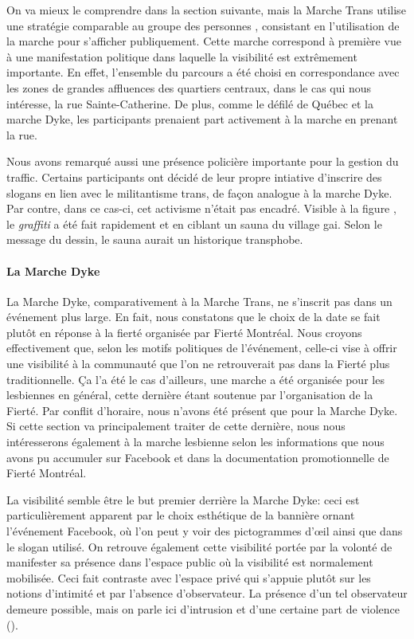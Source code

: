 On va mieux le comprendre dans la section suivante, mais la Marche Trans utilise une stratégie comparable au groupe des personnes \dyke{}, consistant en l'utilisation de la marche pour s'afficher publiquement.
Cette marche correspond à première vue à une manifestation politique dans laquelle la visibilité est extrêmement importante.
En effet, l'ensemble du parcours a été choisi en correspondance avec les zones de grandes affluences des quartiers centraux, dans le cas qui nous intéresse, la rue Sainte-Catherine.
De plus, comme le défilé de Québec et la marche Dyke, les participants prenaient part activement à la marche en prenant la rue.

Nous avons remarqué aussi une présence policière importante pour la gestion du traffic.
Certains participants ont décidé de leur propre intiative d'inscrire des slogans en lien avec le militantisme trans, de façon analogue à la marche Dyke.
Par contre, dans ce cas-ci, cet activisme n'était pas encadré.
Visible à la figure , le \emph{graffiti} a été fait rapidement et en ciblant un sauna du village gai.
Selon le message du dessin, le sauna aurait un historique transphobe.


\paragraph{La Marche Dyke}
\label{subsubsec:marchedyke}
La Marche Dyke, comparativement à la Marche Trans, ne s'inscrit pas dans un événement plus large.
En fait, nous constatons que le choix de la date se fait plutôt en réponse à la fierté organisée par Fierté Montréal.
Nous croyons effectivement que, selon les motifs politiques de l'événement, celle-ci vise à offrir une visibilité à la communauté \dyke{} que l'on ne retrouverait pas dans la Fierté plus traditionnelle.
Ça l'a été le cas d'ailleurs, une marche a été organisée pour les lesbiennes en général, cette dernière étant soutenue par l'organisation de la Fierté.
Par conflit d'horaire, nous n'avons été présent que pour la Marche Dyke.
Si cette section va principalement traiter de cette dernière, nous nous intéresserons également à la marche lesbienne selon les informations que nous avons pu accumuler sur Facebook et dans la documentation promotionnelle de Fierté Montréal.

La visibilité semble être le but premier derrière la Marche Dyke: ceci est particulièrement apparent par le choix esthétique de la bannière ornant l'événement Facebook, où l'on peut y voir des pictogrammes d'œil ainsi que dans le slogan utilisé.
On retrouve également cette visibilité portée par la volonté de manifester sa présence dans l'espace public où la visibilité est normalement mobilisée.
Ceci fait contraste avec l'espace privé qui s'appuie plutôt sur les notions d'intimité et par l'absence d'observateur.
La présence d'un tel observateur demeure possible, mais on parle  ici d'intrusion et d'une certaine part de violence ().


